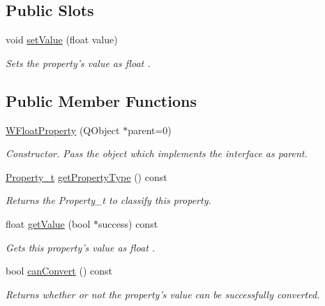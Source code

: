 \subsection*{Public Slots}
\begin{DoxyCompactItemize}
\item 
void \hyperlink{class_w_float_property_addd5ab4fe5a6b75f12e604c994c4d096}{set\-Value} (float value)
\begin{DoxyCompactList}\small\item\em Sets the property's value as float . \end{DoxyCompactList}\end{DoxyCompactItemize}
\subsection*{Public Member Functions}
\begin{DoxyCompactItemize}
\item 
\hyperlink{class_w_float_property_a0feb213835bd18827d230c8de6c8b788}{W\-Float\-Property} (Q\-Object $\ast$parent=0)
\begin{DoxyCompactList}\small\item\em Constructor. Pass the object which implements the interface as parent. \end{DoxyCompactList}\item 
\hyperlink{group___property_classes_ga38f1ccddda12c7cb50b868c9f789ee37}{Property\-\_\-t} \hyperlink{class_w_float_property_adbf6d34b27481c66c70379872eca1947}{get\-Property\-Type} () const 
\begin{DoxyCompactList}\small\item\em Returns the Property\-\_\-t to classify this property. \end{DoxyCompactList}\item 
float \hyperlink{class_w_float_property_acdfaccfb44bff32042d5eecb377f406d}{get\-Value} (bool $\ast$success) const 
\begin{DoxyCompactList}\small\item\em Gets this property's value as float . \end{DoxyCompactList}\item 
bool \hyperlink{class_w_float_property_a7eee2964a782c7909b11f7621504fc11}{can\-Convert} () const 
\begin{DoxyCompactList}\small\item\em Returns whether or not the property's value can be successfully converted. \end{DoxyCompactList}\end{DoxyCompactItemize}
